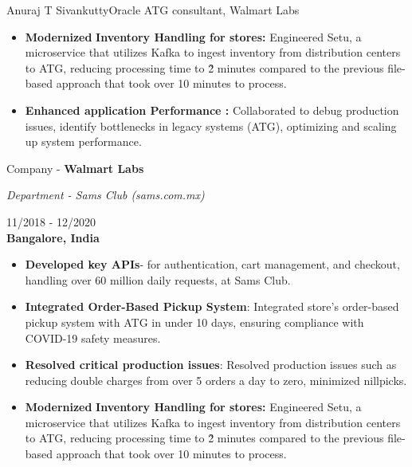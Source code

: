 \documentclass{article}
\begin{document}
\begin{cv}{Anuraj T Sivankutty}{Oracle ATG consultant, Walmart Labs}
\begin{cvevent}[Jan - 2020][present]
\begin{itemize}
        \item  \textbf{Modernized} \textbf{Inventory Handling for stores: }Engineered Setu, a microservice that utilizes Kafka to ingest inventory from distribution centers to ATG, reducing processing time to \~2 minutes compared to the previous file-based approach that took over 10 minutes to process.

         \item  \textbf{ Enhanced application Performance :  } Collaborated  to debug production issues, identify bottlenecks in legacy systems (ATG), optimizing and scaling up system performance.

    \end{itemize}
\end{cvevent}

\begin{cvevent}[November-2018][December-2020]
      \begin{center}
      \begin{minipage}{0.6\textwidth}
         Company - \textbf{Walmart Labs}
        \vspace{0.1cm}
        
        \textit{Department - Sams Club (sams.com.mx)}
      \end{minipage}
      \hfill
      \begin{minipage}{0.35\textwidth}
          \small{11/2018 - 12/2020}\\
        \textbf{Bangalore, India}
      \end{minipage}
    \end{center}
    
    \begin{itemize}
        \item  \textbf{Developed key APIs}- for authentication, cart management, and checkout, handling over 60 million daily requests, at Sams Club.

        \item \textbf{Integrated Order-Based Pickup System}: Integrated store's order-based pickup system with ATG in under 10 days, ensuring compliance with COVID-19 safety measures. 
        
        \item  \textbf{Resolved critical production issues}: Resolved production issues such as reducing double charges from over 5 orders a day to zero, minimized nillpicks.

        \item  \textbf{Modernized} \textbf{Inventory Handling for stores: }Engineered Setu, a microservice that utilizes Kafka to ingest inventory from distribution centers to ATG, reducing processing time to \~2 minutes compared to the previous file-based approach that took over 10 minutes to process.
        

\end{itemize}
\end{cvevent}
\end{cv}
\end{document}
